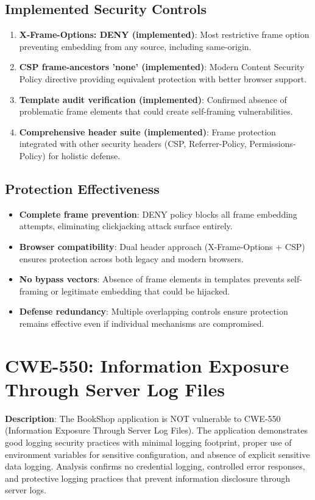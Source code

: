 \documentclass[]{UCD_CS_FYP_Report}
\begin{document}
\subsection{Implemented Security Controls}
\begin{enumerate}
	\item \textbf{X-Frame-Options: DENY (implemented)}: Most restrictive frame option preventing embedding from any source, including same-origin.
	\item \textbf{CSP frame-ancestors 'none' (implemented)}: Modern Content Security Policy directive providing equivalent protection with better browser support.
	\item \textbf{Template audit verification (implemented)}: Confirmed absence of problematic frame elements that could create self-framing vulnerabilities.
	\item \textbf{Comprehensive header suite (implemented)}: Frame protection integrated with other security headers (CSP, Referrer-Policy, Permissions-Policy) for holistic defense.
\end{enumerate}

\subsection{Protection Effectiveness}
\begin{itemize}
	\item \textbf{Complete frame prevention}: DENY policy blocks all frame embedding attempts, eliminating clickjacking attack surface entirely.
	\item \textbf{Browser compatibility}: Dual header approach (X-Frame-Options + CSP) ensures protection across both legacy and modern browsers.
	\item \textbf{No bypass vectors}: Absence of frame elements in templates prevents self-framing or legitimate embedding that could be hijacked.
	\item \textbf{Defense redundancy}: Multiple overlapping controls ensure protection remains effective even if individual mechanisms are compromised.
\end{itemize}



\section{CWE-550: Information Exposure Through Server Log Files}

\textbf{Description}: The BookShop application is NOT vulnerable to CWE-550 (Information Exposure Through Server Log Files). The application demonstrates good logging security practices with minimal logging footprint, proper use of environment variables for sensitive configuration, and absence of explicit sensitive data logging. Analysis confirms no credential logging, controlled error responses, and protective logging practices that prevent information disclosure through server logs.
\end{document}
